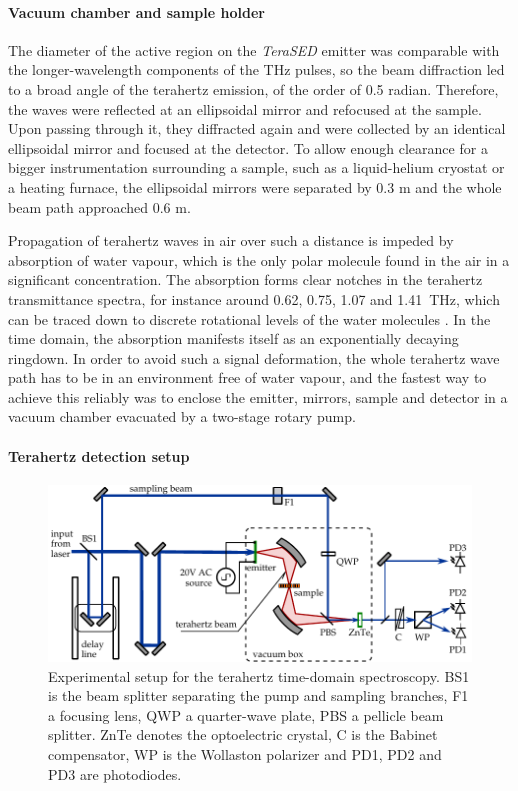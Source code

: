 \paragraph{Vacuum chamber and sample holder}%
The diameter of the active region on the \textit{TeraSED} emitter was comparable with the longer-wavelength components of the THz pulses, so the beam diffraction led to a broad angle of the terahertz emission, of the order of 0.5 radian. Therefore, the waves were reflected at an ellipsoidal %
 mirror and refocused at the sample. Upon passing through it, they diffracted again and were collected by an identical ellipsoidal mirror and focused at the detector. 
To allow enough clearance for a bigger instrumentation surrounding a sample, such as a liquid-helium cryostat or a heating furnace, the ellipsoidal mirrors were separated by 0.3 m and the whole beam path approached 0.6 m. %

Propagation of terahertz waves in air over such a distance is impeded by absorption of water vapour, which is the only polar molecule found in the air in a significant concentration. The absorption forms clear notches in the terahertz transmittance spectra, for instance around 0.62, 0.75, 1.07 and 1.41~THz, which can be traced down to discrete rotational levels of the water molecules \cite{exter1989}. In the time domain, the absorption manifests itself as an exponentially decaying ringdown. %
In order to avoid such a signal deformation,
the whole terahertz wave path has to be in an environment free of water vapour, and the fastest way to achieve this reliably was to enclose the emitter, mirrors, sample and detector in a vacuum chamber evacuated by a two-stage rotary pump. 

\paragraph{Terahertz detection setup}%
\begin{figure}[ht] \caption{Experimental setup for the terahertz time-domain spectroscopy. BS1 is the beam splitter separating the pump and sampling branches, F1 a focusing lens, QWP a quarter-wave plate, PBS a pellicle beam splitter.  ZnTe denotes the optoelectric crystal, C is the Babinet compensator, WP is the Wollaston polarizer and PD1, PD2 and PD3 are photodiodes.} \label{fg_exp} \centering 
	\includegraphics[width=\textwidth]{img/exp_THz_sampling.pdf}
\end{figure}

